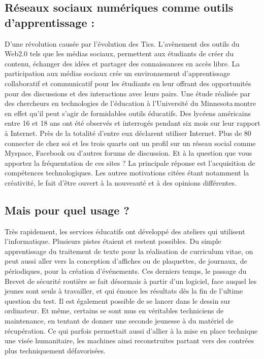 \documentclass[12pt,a4paper,titlepage]{article}
\begin{document}
\subsection{Réseaux sociaux numériques comme outils d’apprentissage :}
D’une révolution causée par l’évolution des Tics. L’avènement des outils du Web2.0
tels que les médias sociaux, permettent aux étudiants de créer du contenu, échanger
des idées et partager des connaissances en accès libre. La participation aux médias
sociaux crée un environnement d’apprentissage collaboratif et communicatif pour les
étudiants en leur offrant des opportunités pour des discussions et des interactions avec leurs
pairs. \newline
Une étude réalisée par des chercheurs en technologies de l’éducation à l’Université du
Minnesota montre en effet qu’il peut s’agir de formidables outils éducatifs. Des lycéens
américains entre 16 et 18 ans ont été observés et interrogés pendant six mois sur leur rapport
à Internet. Près de la totalité d’entre eux déclarent utiliser Internet. Plus de 80 %
connecter de chez soi et les trois quarts ont un profil sur un réseau social comme Myspace,
Facebook ou d’autres forums de discussion. \newline
Et à la question que vous apportez la fréquentation de ces sites ? La principale réponse est
l’acquisition de compétences technologiques. Les autres motivations citées étant notamment
la créativité, le fait d’être ouvert à la nouveauté et à des opinions différentes. \newline
\subsection{Mais pour quel usage ?}
Très rapidement, les services éducatifs ont développé des ateliers qui utilisent
l’informatique. Plusieurs pistes étaient et restent possibles. Du simple apprentissage du
traitement de texte pour la réalisation de curriculum vitae, on peut aussi aller vers la
conception d’affiches ou de plaquettes, de journaux, de périodiques, pour la création
d’événements. Ces derniers temps, le passage du Brevet de sécurité routière se fait désormais
à partir d’un logiciel, face auquel les jeunes sont seuls à travailler, et qui énonce les résultats
dès la fin de l’ultime question du test. Il est également possible de se lancer dans le dessin sur
ordinateur. Et même, certains se sont mus en véritables techniciens de maintenance, en tentant
de donner une seconde jeunesse à du matériel de récupération. Ce qui parfois permettait aussi
d’allier à la mise en place technique une visée humanitaire, les machines ainsi reconstruites
partant vers des contrées plus techniquement défavorisées.
\end{document}
